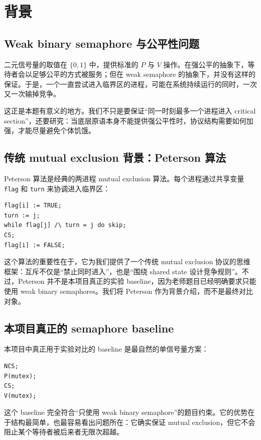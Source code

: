 \documentclass[11pt]{ctexart}
\begin{document}
\section{背景}

\subsection{Weak binary semaphore 与公平性问题}

二元信号量的取值在 $\{0,1\}$ 中，提供标准的 $P$ 与 $V$ 操作。在强公平的抽象下，等待者会以足够公平的方式被服务；但在 weak semaphore 的抽象下，并没有这样的保证。于是，一个一直尝试进入临界区的进程，可能在系统持续运行的同时，一次又一次输掉竞争。

这正是本题有意义的地方。我们不只是要保证“同一时刻最多一个进程进入 critical section”，还要研究：当底层原语本身不能提供强公平性时，协议结构需要如何加强，才能尽量避免个体饥饿。

\subsection{传统 mutual exclusion 背景：Peterson 算法}

Peterson 算法是经典的两进程 mutual exclusion 算法。每个进程通过共享变量 \texttt{flag} 和 \texttt{turn} 来协调进入临界区：

\begin{lstlisting}
flag[i] := TRUE;
turn := j;
while flag[j] /\ turn = j do skip;
CS;
flag[i] := FALSE;
\end{lstlisting}

这个算法的重要性在于，它为我们提供了一个传统 mutual exclusion 协议的思维框架：互斥不仅是“禁止同时进入”，也是“围绕 shared state 设计竞争规则”。不过，Peterson 并不是本项目真正的实验 baseline，因为老师题目已经明确要求只能使用 weak binary semaphores。我们将 Peterson 作为背景介绍，而不是最终对比对象。

\subsection{本项目真正的 semaphore baseline}

本项目中真正用于实验对比的 baseline 是最自然的单信号量方案：

\begin{lstlisting}
NCS;
P(mutex);
CS;
V(mutex);
\end{lstlisting}

这个 baseline 完全符合“只使用 weak binary semaphore”的题目约束。它的优势在于结构最简单，也最容易看出问题所在：它确实保证 mutual exclusion，但它不会阻止某个等待者被后来者无限次超越。
\end{document}
